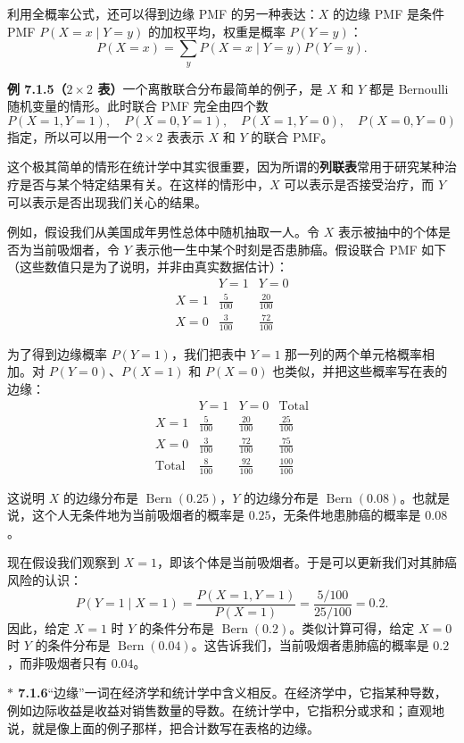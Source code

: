 \documentclass[UTF8,12pt,a4paper,fontset=fandol]{ctexart}
\newcommand{\biohazard}{\ensuremath{\ast}}
\begin{document}
利用全概率公式，还可以得到边缘 PMF 的另一种表达：$X$ 的边缘 PMF 是条件 PMF $P(X=x\mid Y=y)$ 的加权平均，权重是概率 $P(Y=y)$：
\[
  P(X=x)=\sum_y P(X=x\mid Y=y)P(Y=y).
\]

\noindent\textbf{例 7.1.5（$2\times 2$ 表）}\quad 一个离散联合分布最简单的例子，是 $X$ 和 $Y$ 都是 Bernoulli 随机变量的情形。此时联合 PMF 完全由四个数
\[
  P(X=1,Y=1),\quad P(X=0,Y=1),\quad P(X=1,Y=0),\quad P(X=0,Y=0)
\]
指定，所以可以用一个 $2\times 2$ 表表示 $X$ 和 $Y$ 的联合 PMF。

这个极其简单的情形在统计学中其实很重要，因为所谓的\textbf{列联表}常用于研究某种治疗是否与某个特定结果有关。在这样的情形中，$X$ 可以表示是否接受治疗，而 $Y$ 可以表示是否出现我们关心的结果。

例如，假设我们从美国成年男性总体中随机抽取一人。令 $X$ 表示被抽中的个体是否为当前吸烟者，令 $Y$ 表示他一生中某个时刻是否患肺癌。假设联合 PMF 如下（这些数值只是为了说明，并非由真实数据估计）：
\[
\begin{array}{c|cc}
 & Y=1 & Y=0\\ \hline
X=1 & \frac{5}{100} & \frac{20}{100}\\
X=0 & \frac{3}{100} & \frac{72}{100}
\end{array}
\]

为了得到边缘概率 $P(Y=1)$，我们把表中 $Y=1$ 那一列的两个单元格概率相加。对 $P(Y=0)$、$P(X=1)$ 和 $P(X=0)$ 也类似，并把这些概率写在表的边缘：
\[
\begin{array}{c|cc|c}
 & Y=1 & Y=0 & \text{Total}\\ \hline
X=1 & \frac{5}{100} & \frac{20}{100} & \frac{25}{100}\\
X=0 & \frac{3}{100} & \frac{72}{100} & \frac{75}{100}\\ \hline
\text{Total} & \frac{8}{100} & \frac{92}{100} & \frac{100}{100}
\end{array}
\]

这说明 $X$ 的边缘分布是 $\operatorname{Bern}(0.25)$，$Y$ 的边缘分布是 $\operatorname{Bern}(0.08)$。也就是说，这个人无条件地为当前吸烟者的概率是 $0.25$，无条件地患肺癌的概率是 $0.08$。

现在假设我们观察到 $X=1$，即该个体是当前吸烟者。于是可以更新我们对其肺癌风险的认识：
\[
  P(Y=1\mid X=1)
  =\frac{P(X=1,Y=1)}{P(X=1)}
  =\frac{5/100}{25/100}=0.2.
\]
因此，给定 $X=1$ 时 $Y$ 的条件分布是 $\operatorname{Bern}(0.2)$。类似计算可得，给定 $X=0$ 时 $Y$ 的条件分布是 $\operatorname{Bern}(0.04)$。这告诉我们，当前吸烟者患肺癌的概率是 $0.2$，而非吸烟者只有 $0.04$。

\noindent\textbf{$\biohazard$ 7.1.6}\quad “边缘”一词在经济学和统计学中含义相反。在经济学中，它指某种导数，例如边际收益是收益对销售数量的导数。在统计学中，它指积分或求和；直观地说，就是像上面的例子那样，把合计数写在表格的边缘。
\end{document}
